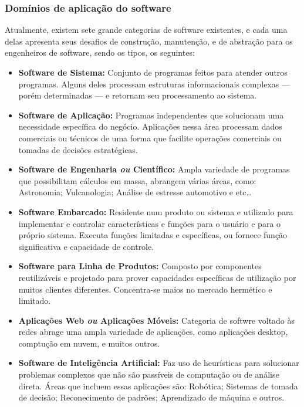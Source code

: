 \documentclass[12pt, a4paper]{paper}
\begin{document}
\subsubsection{Domínios de aplicação do software}
Atualmente, existem sete grande categorias de software existentes, e cada uma delas apresenta seus desafios de construção, manutenção, e de abstração para os engenheiros de software, sendo os tipos, os seguintes:
\begin{itemize}

  \item \textbf{Software de Sistema: } Conjunto de programas feitos para atender outros programas. Alguns deles processam estruturas informacionais complexas --- porém determinadas --- e retornam seu processamento ao sistema.
  \item \textbf{Software de Aplicação: }Programas independentes que solucionam uma necessidade específica do negócio. Aplicações nessa área processam dados comerciais ou técnicos de uma forma que facilite operações comerciais ou tomadas de decisões estratégicas.
  \item \textbf{Software de Engenharia \textit{ou} Científico: } Ampla variedade de programas que possibilitam cálculos em massa, abrangem várias áreas, como: Astronomia; Vulcanologia; Análise de estresse automotivo e etc\dots
  \item \textbf{Software Embarcado: } Residente num produto ou sistema e utilizado para implementar e controlar características e funções para o usuário e para o próprio sistema. Executa funções limitadas e específicas, ou fornece função significativa e capacidade de controle.
  \item \textbf{Software para Linha de Produtos: } Composto por componentes reutilizáveis e projetado para prover capacidades específicas de utilização por muitos clientes diferentes. Concentra-se maios no mercado hermético e limitado.
  \item \textbf{Aplicações Web \textit{ou} Aplicações Móveis: } Categoria de softwre voltado às redes abrage uma ampla variedade de aplicações, como aplicações desktop, comptução em nuvem, e muitos outros.
  \item \textbf{Software de Inteligência Artificial: } Faz uso de heurísticas para solucionar problemas complexos que não são passíveis de computação ou de análise direta. Áreas que incluem essas aplicações são: Robótica; Sistemas de tomada de decisão; Reconecimento de padrões; Aprendizado de máquina e outros.
\end{itemize}
\end{document}
